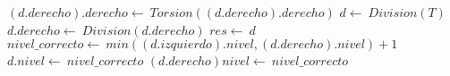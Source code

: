 \begin{algorithm}
\begin{algorithmic}[0]
	 
		\State $(d.derecho).derecho\gets\ Torsion((d.derecho).derecho)$ 
	\EndIf
	\State $d\gets\ Division(T)$ 
	\State $d.derecho\gets\ Division(d.derecho)$ 
	\State $res\gets\ d$ 
\EndFunction
{}
	\State $nivel\_correcto\gets\ min((d.izquierdo).nivel, (d.derecho).nivel)+1$ 
	 
		\State $d.nivel\gets\ nivel\_correcto$	 
		 
			\State $(d.derecho)nivel\gets\ nivel\_correcto$ 
		\EndIf
	\EndIf
\EndProcedure
\end{algorithmic}
\end{algorithm}


